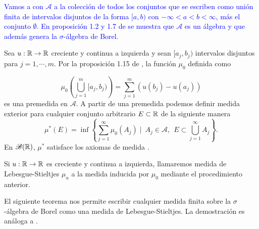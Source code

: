 \textcolor{blue}{Vamos a  con $\mathcal{A}$  a la colección de todos los conjuntos que se escriben como unión finita de intervalos disjuntos de la forma $[a,b)$ con $-\infty<a<b<\infty$, más el conjunto $\emptyset$. En proposición 1.2 y  1.7 de \cite{folland} se muestra que  $\mathcal{A}$ es un álgebra y que además genera la $\sigma$-álgebra de Borel.}



Sea  $u:\mathbb{R} \to \mathbb{R}$  creciente y continua a izquierda y sean  $[a_j,b_j)$ intervalos disjuntos para $j=1, \cdots ,m$. Por la proposición 1.15 de \cite{folland}, la función  $\mu_{0}$ definida como 

$$\mu_{0}\left( \bigcup_{j=1}^m[a_j,b_j)\right)  =\sum_{j=1}^{m}\left(u(b_j)-u(a_j)\right) $$
es una premedida  en $\mathcal{A}$. A partir de una premedida podemos definir  medida exterior para cualquier conjunto arbitrario $E\subset\mathbb{R}$  de la siguiente manera 
$$\mu^{*}(E)=\inf\left\lbrace \sum_{ j=1 }^{\infty}\mu_{0}(A_j) \mid \ A_j\in \mathcal{A}, \ \  E\subset\bigcup_{j=1}^{\infty}A_j \right\rbrace. $$\index[Simbolo]{$\mu^{*}$}En $\mathscr{B}(\mathbb{R})$, $\mu^{*}$ satisface los axiomas de medida \cite[Proposición 1.13]{folland}.
\begin{defi}
	Si $u:\mathbb{R} \to \mathbb{R}$ es creciente y continua a izquierda, llamaremos medida de Lebesgue-Stieltjes $\mu_{u}$ a la medida inducida por $\mu_{0}$ mediante el procedimiento anterior. 
\end{defi}

El siguiente teorema nos permite escribir cualquier medida finita sobre la $\sigma$-álgebra de Borel como una medida de Lebesgue-Stieltjes. La demostración es análoga a  \cite[Teorema  1.16]{folland}.


